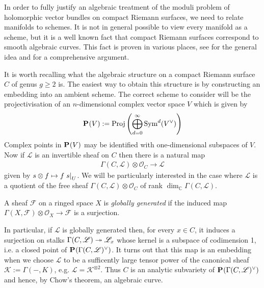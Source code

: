 \documentclass[12pt]{ociamthesis}  %
\begin{document}
In order to fully justify an algebraic treatment of the
moduli problem of holomorphic vector bundles on compact Riemann surfaces, we
need to relate manifolds to schemes. It is not in general possible
to view every manifold as a scheme, but it is a well known fact that
compact Riemann surfaces correspond to smooth algebraic curves.
This fact is proven in various places, see \cite[215]{griffiths1994}
for the general idea and \cite[5-16]{harris2011}
for a comprehensive argument.

It is worth recalling what the algebraic structure on a compact
Riemann surface $C$ of genus $g\geq 2$ is. The easiest way to obtain
this structure is by constructing an embedding into an ambient
scheme. The correct scheme to consider will be the projectivisation
of an $n$-dimensional complex vector space $V$ which is given
by
\begin{align*}
  \mathbf{P}^{}_{}(V) := \operatorname{Proj}\left({
        \bigoplus_{d=0}^\infty \operatorname{Sym}^d(V^\vee)
      }\right)
\end{align*}
Complex points in $\mathbf{P}^{}_{}(V)$ may be identified
with one-dimensional subspaces of $V$.
Now if $\mathscr L$ is
an invertible sheaf on $C$ then there is a natural map
\begin{align}\label{eq:natural_line_bundle_map}
  \Gamma(C,\mathscr L)\otimes\mathscr O_C \to \mathscr L
\end{align}
given by $s\otimes f \mapsto f\left.{s}\right\vert_{U}$. We will be
particularly interested in the case where $\mathscr L$ is a
quotient of the free sheaf
$\Gamma(C,\mathscr L)\otimes\mathscr O_C$ of rank
$\dim_{\mathbb C} \Gamma(C,\mathscr L)$.

\begin{definition}
  A sheaf $\mathscr F$ on a ringed space $X$ is
  \emph{globally generated} if the induced map
  $\Gamma(X,\mathscr F) \otimes \mathscr O_X \to \mathscr F$
  is a surjection.
\end{definition}

In particular, if $\mathscr L$ is globally generated then, for every $x\in C$,
it induces a surjection on stalks $\Gamma(C,\mathscr L) \twoheadrightarrow \mathscr L_x$
whose kernel is a subspace of codimension 1, i.e. a closed point of
$\mathbf{P}^{}_{}(\Gamma(C,\mathscr L)^\vee)$. It turns out that this map is an
embedding when we choose $\mathscr L$ to be a sufficently large tensor power of
the canonical sheaf $\mathscr K := \Gamma(-,K)$, e.g. $\mathscr L = \mathscr
  K^{\otimes 2}$.  Thus $C$ is an analytic subvariety of
$\mathbf{P}^{}_{}(\Gamma(C,\mathscr L)^\vee)$ and hence, by Chow's
theorem, an algebraic curve.
\end{document}
